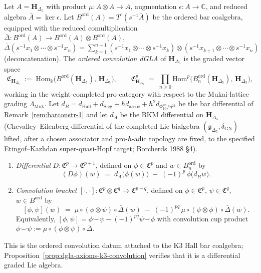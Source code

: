 \begin{definition}
\label{def:convolution-dgla-k3}
Let $A = \mathbf{H}_{\Delta_5}$ with product
$\mu\colon A\otimes A\to A$, augmentation
$\epsilon\colon A\to \mathbb{C}$, and reduced algebra
$\bar A = \ker\epsilon$. Let
$B^{\mathrm{ord}}(A) = T^c(s^{-1}\bar A)$ be the ordered bar coalgebra,
equipped with the reduced comultiplication
$\bar\Delta\colon B^{\mathrm{ord}}(A) \to B^{\mathrm{ord}}(A)\otimes
B^{\mathrm{ord}}(A)$,
$\bar\Delta(s^{-1}x_1\otimes\cdots\otimes s^{-1}x_n) =
\sum_{k=1}^{n-1} (s^{-1}x_1\otimes\cdots\otimes s^{-1}x_k)\otimes
(s^{-1}x_{k+1}\otimes\cdots\otimes s^{-1}x_n)$
(deconcatenation).
The \emph{ordered convolution dGLA} of $\mathbf{H}_{\Delta_5}$ is the
graded vector space
\[
 \mathfrak{C}_{\mathbf{H}_{\Delta_5}}
 \;:=\;
 \mathrm{Hom}_{\Bbbk}\!\bigl(B^{\mathrm{ord}}(\mathbf{H}_{\Delta_5}),\,
 \mathbf{H}_{\Delta_5}\bigr),
 \qquad
 \mathfrak{C}^p_{\mathbf{H}_{\Delta_5}}
 \;=\;
 \prod_{n\ge 0}
 \mathrm{Hom}^p\!\bigl(B^{\mathrm{ord}}_n(\mathbf{H}_{\Delta_5}),\,
 \mathbf{H}_{\Delta_5}\bigr),
\]
working in the weight-completed pro-category with respect to the
Mukai-lattice grading $\Lambda_{\mathrm{Muk}}$.
Let $d_B = d_{\mathrm{Hall}} + d_{\mathrm{Sieg}} + \hbar d_{\mathrm{assoc}}
+ \hbar^2 d_{\Phi_{10}^{\mathrm{un}}/\eta^{24}}$ be the bar differential of
Remark~\ref{rem:barconstr-1} and let $d_A$ be the BKM differential on
$\mathbf{H}_{\Delta_5}$ (Chevalley--Eilenberg differential of the
completed Lie bialgebra
$(\mathfrak{g}_{\Delta_5},\delta_{\mathrm{GN}})$ lifted, after a
chosen associator and pro-\(\hbar\)-adic topology are fixed, to the
specified Etingof--Kazhdan super-quasi-Hopf target; Borcherds 1988
\S 4).
\begin{enumerate}[label=\textup{(\alph*)}]
\item \emph{Differential} $D\colon
 \mathfrak{C}^p\to\mathfrak{C}^{p+1}$, defined on $\phi\in\mathfrak{C}^p$
 and $w\in B^{\mathrm{ord}}_n$ by
 \[
 (D\phi)(w) \;=\; d_A\bigl(\phi(w)\bigr)
 \;-\; (-1)^{p}\,\phi\bigl(d_B w\bigr).
 \]
\item \emph{Convolution bracket} $[\cdot,\cdot]\colon
 \mathfrak{C}^p\otimes\mathfrak{C}^q\to\mathfrak{C}^{p+q}$, defined
 on $\phi\in\mathfrak{C}^p$, $\psi\in\mathfrak{C}^q$, $w\in
 B^{\mathrm{ord}}$ by
 \[
 [\phi,\psi](w) \;=\; \mu\circ(\phi\otimes\psi)\circ \bar\Delta(w)
 \;-\; (-1)^{pq}\,
 \mu\circ(\psi\otimes\phi)\circ \bar\Delta(w).
 \]
 Equivalently, $[\phi,\psi] = \phi\smile\psi - (-1)^{pq}\psi\smile\phi$
 with convolution cup product
 $\phi\smile\psi := \mu\circ(\phi\otimes\psi)\circ\bar\Delta$.
\end{enumerate}
This is the ordered convolution datum attached to the K3 Hall bar
coalgebra; Proposition~\ref{prop:dgla-axioms-k3-convolution} verifies
that it is a differential graded Lie algebra.
\end{definition}

